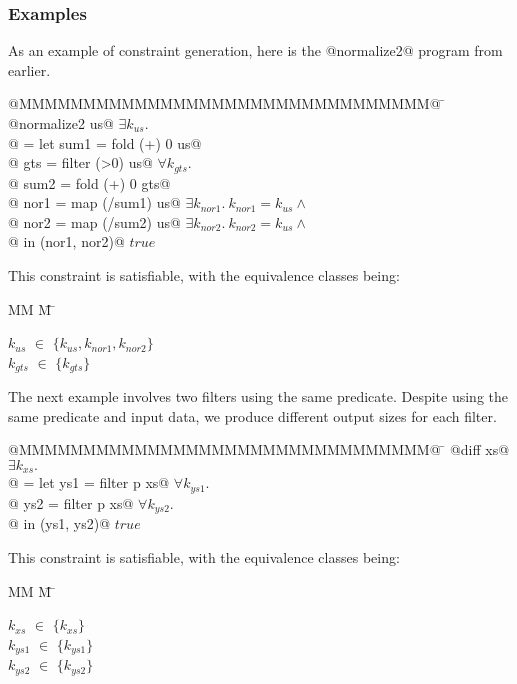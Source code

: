 \subsubsection{Examples}
As an example of constraint generation, here is the @normalize2@ program from earlier.
\begin{tabbing}
@MMMMMMMMMMMMMMMMMMMMMMMMMMMMMMMM@  \= \kill
@normalize2 us@                     \> $\exists k_{us}.$      \\
@ = let sum1 = fold   (+) 0 us@     \>                      \\
@       gts  = filter (>0)  us@     \> $\forall k_{gts}.$ \\
@       sum2 = fold   (+) 0 gts@    \> \\
@       nor1 = map  (/sum1) us@     \> $\exists k_{nor1}.\ k_{nor1} = k_{us} \wedge$ \\
@       nor2 = map  (/sum2) us@     \> $\exists k_{nor2}.\ k_{nor2} = k_{us} \wedge$ \\
@   in (nor1, nor2)@                \> $true$ \\
\end{tabbing}
This constraint is satisfiable, with the equivalence classes being:
\newcommand{\eqclasses}[1]{
    \begin{tabbing}
        MM \= M \= \kill
        #1
    \end{tabbing}}
\newcommand{\eqclass}[2]{$#1$ \> $\in$ \> $\{#2\}$ \\}
\eqclasses{
    \eqclass{k_{us}}{k_{us}, k_{nor1}, k_{nor2}}
    \eqclass{k_{gts}}{k_{gts}}
}

The next example involves two filters using the same predicate.
Despite using the same predicate and input data, we produce different output sizes for each filter.
\begin{tabbing}
@MMMMMMMMMMMMMMMMMMMMMMMMMMMMMMMM@  \= \kill
@diff xs@                           \> $\exists k_{xs}.$ \\
@ = let ys1 = filter p xs@          \> $\forall k_{ys1}.$       \\
@       ys2 = filter p xs@          \> $\forall k_{ys2}.$       \\
@   in (ys1, ys2)@                  \> $true$                   \\
\end{tabbing}

This constraint is satisfiable, with the equivalence classes being:
\eqclasses{
    \eqclass{k_{xs}}    {k_{xs}}
    \eqclass{k_{ys1}}   {k_{ys1}}
    \eqclass{k_{ys2}}   {k_{ys2}}
}

